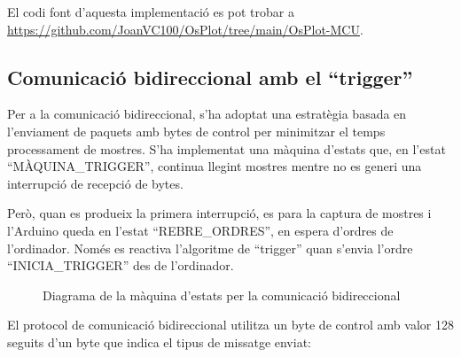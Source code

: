 \documentclass{tfgitic}[2023/06/30]
\begin{document}
El codi font d'aquesta implementació es pot trobar a
\url{https://github.com/JoanVC100/OsPlot/tree/main/OsPlot-MCU}.

\subsection{Comunicació bidireccional amb el ``trigger''}

Per a la comunicació bidireccional, s'ha adoptat una estratègia basada
en l'enviament de paquets amb bytes de control per minimitzar el temps
processament de mostres. S'ha implementat una màquina d'estats que, en
l'estat ``MÀQUINA\_TRIGGER'', continua llegint mostres mentre no es
generi una interrupció de recepció de bytes.

Però, quan es produeix la primera interrupció, es para la captura de
mostres i l'Arduino queda en l'estat ``REBRE\_ORDRES'', en espera
d'ordres de l'ordinador. Només es reactiva l'algoritme de ``trigger''
quan s'envia l'ordre ``INICIA\_TRIGGER'' des de l'ordinador.

\begin{figure}[!hb]
      \centering
      \caption{Diagrama de la màquina d'estats per la comunicació bidireccional}
\end{figure}

\clearpage

El protocol de comunicació bidireccional utilitza un byte de control
amb valor 128 seguits d'un byte que indica el tipus de missatge
enviat:
\end{document}
